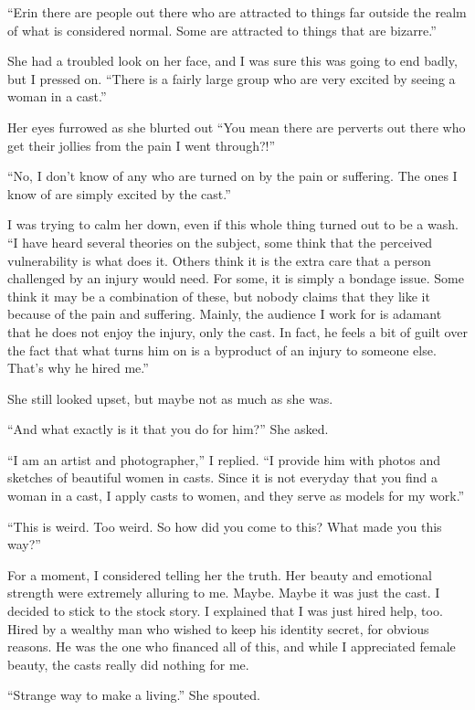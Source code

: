 ``Erin there are people out there who are attracted to things far outside the realm of what
is considered normal. Some are attracted to things that are bizarre.''

She had a troubled look on her face, and I was sure this was going to end badly, but I
pressed on. ``There is a fairly large group who are very excited by seeing a woman in a cast.''

Her eyes furrowed as she blurted out ``You mean there are perverts out there who get their
jollies from the pain I went through?!''

``No, I don't know of any who are turned on by the pain or suffering. The ones I know of are
simply excited by the cast.''

I was trying to calm her down, even if this whole thing turned out to be a wash. ``I have
heard several theories on the subject, some think that the perceived vulnerability is what does
it. Others think it is the extra care that a person challenged by an injury would need. For
some, it is simply a bondage issue. Some think it may be a combination of these, but nobody
claims that they like it because of the pain and suffering. Mainly, the audience I work for is
adamant that he does not enjoy the injury, only the cast. In fact, he feels a bit of guilt over
the fact that what turns him on is a byproduct of an injury to someone else. That's why he hired
me.''

She still looked upset, but maybe not as much as she was.

``And what exactly is it that you do for him?'' She asked.

``I am an artist and photographer,'' I replied. ``I provide him with photos and sketches of
beautiful women in casts. Since it is not everyday that you find a woman in a cast, I apply
casts to women, and they serve as models for my work.''

``This is weird. Too weird. So how did you come to this? What made you this way?''

For a moment, I considered telling her the truth. Her beauty and emotional strength were
extremely alluring to me. Maybe. Maybe it was just the cast. I decided to stick to the stock
story. I explained that I was just hired help, too. Hired by a wealthy man who wished to keep
his identity secret, for obvious reasons. He was the one who financed all of this, and while I
appreciated female beauty, the casts really did nothing for me.

``Strange way to make a living.'' She spouted.

